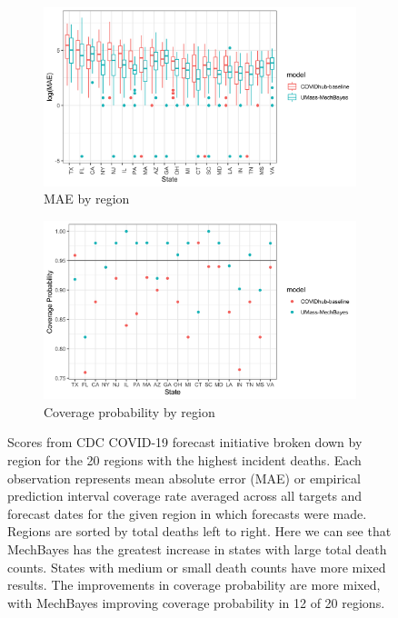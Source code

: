 \documentclass[11pt]{amsart}
\begin{document}
\begin{figure}
  \centering

\begin{subfigure}{\textwidth}
  \centering
    \includegraphics[scale=.2]{mae_results_by_region_inc.png}
    \caption{MAE by region}
\end{subfigure}
\begin{subfigure}{\textwidth}
  \centering
    \includegraphics[scale=.20]{cp_results_by_location.png}
    \caption{Coverage probability by region}
\end{subfigure}
\caption{Scores from CDC COVID-19 forecast initiative broken down by region for the 20 regions with the highest incident deaths. Each observation represents mean absolute error (MAE) or empirical prediction interval coverage rate averaged across all targets and forecast dates for the given region in which forecasts were made. Regions are sorted by total deaths left to right. Here we can see that MechBayes has the greatest increase in states with large total death counts. States with medium or small death counts have more mixed results. The improvements in coverage probability are more mixed, with MechBayes improving coverage probability in 12 of 20 regions. }
\label{fig:covidhub_region_results}
\end{figure}
\end{document}

